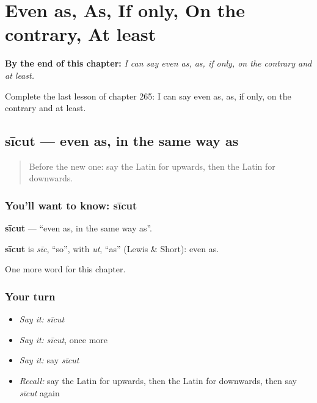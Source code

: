 
\chapter{Even as, As, If only, On the contrary, At least}
\label{ch:la-even-as-as-if-only-on-the-contrary-at-least}

\begin{chapteropening}
\textbf{By the end of this chapter:} \emph{I can say even as, as, if only, on the contrary and at least.}

Complete the last lesson of chapter 265: I can say even as, as, if only, on the contrary and at least.
\end{chapteropening}

\section[sīcut]{sīcut — even as, in the same way as}

\label{lesson:LA-C265-sicut}



\begin{quote}
Before the new one: say the Latin for upwards, then the Latin for downwards.
\end{quote}

\subsection*{You'll want to know: sīcut}
\textbf{sīcut} — \textquotedblleft{}even as, in the same way as\textquotedblright{}.

\begin{cousinweb}
\textbf{sīcut} is \emph{sīc}, \textquotedblleft{}so\textquotedblright{}, with \emph{ut}, \textquotedblleft{}as\textquotedblright{} (Lewis \& Short): even as.
\end{cousinweb}

\begin{grammarlens}[title={What you've built}]
One more word for this chapter.
\end{grammarlens}

\subsection*{Your turn}
\begin{itemize}
\raggedright
  \item \emph{Say it:} \emph{sīcut}
  \item \emph{Say it:} \emph{sīcut}, once more
  \item \emph{Say it:} say \emph{sīcut}
  \item \emph{Recall:} say the Latin for upwards, then the Latin for downwards, then say \emph{sīcut} again
\end{itemize}

